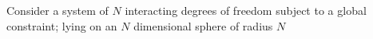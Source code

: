 Consider a system of $N$ interacting degrees of freedom subject to a global constraint; lying on an $N$ dimensional sphere of radius $N$